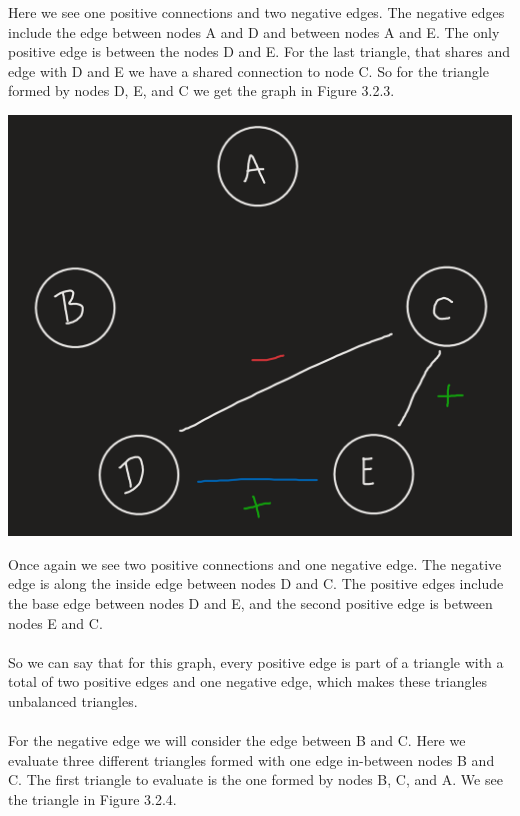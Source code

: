 \documentclass[11pt]{article}
\begin{document}
\begin{enumerate}
{\begin{center}
\end{center}
Here we see one positive connections and two negative edges. The negative edges include the edge between nodes A and D and between nodes A and E.  The only positive edge is between the nodes D and E. For the last triangle, that shares and edge with D and E we have a shared connection to node C.  So for the triangle formed by nodes D, E, and C we get the graph in Figure 3.2.3.
\begin{center}
	\includegraphics[scale=0.5]{Figure_3_2_3}\\
\end{center}
Once again we see two positive connections and one negative edge. The negative edge is along the inside edge between nodes D and C.  The positive edges include the base edge between nodes D and E, and the second positive edge is between nodes E and C.\\\\
So we can say that for this graph, every positive edge is part of a triangle with a total of two positive edges and one negative edge, which makes these triangles unbalanced triangles.\\\\
For the negative edge we will consider the edge between B and C.  Here we evaluate three different triangles formed with one edge in-between nodes B and C. The first triangle to evaluate is the one formed by nodes B, C, and A.  We see the triangle in Figure 3.2.4. 
\begin{center}

\end{center}}
\end{enumerate}
\end{document}
